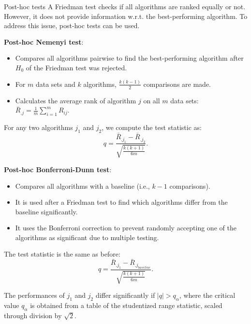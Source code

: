 \begin{vbframe}{Post-hoc tests}
A Friedman test checks if all algorithms are ranked equally or not. However, it does not provide information w.r.t. the best-performing algorithm.
To address this issue, post-hoc tests can be used.

\lz \textbf{Post-hoc Nemenyi test}:
\begin{itemize}
\item Compares all algorithms pairwise to find the best-performing algorithm after $H_0$ of the Friedman test was rejected.
\item For $m$ data sets and $k$ algorithms, $\frac{k(k-1)}{2}$ comparisons are made.
\item Calculates the average rank of algorithm $j$ on all $m$ data sets: $\bar{R}_{.j} =\frac{1}{m} \sum_{i=1}^m R_{ij}.$
\end{itemize}

\lz %
For any two algorithms $j_1$ and $j_2$, we compute the test statistic as:
$$q = \frac{\bar{R}_{.j_1} - \bar{R}_{.j_2}}{\sqrt{\frac{k(k+1)}{6m}}}.$$


\framebreak

\textbf{Post-hoc Bonferroni-Dunn test}:

\begin{itemize}
\item Compares all algorithms with a baseline (i.e., $k-1$ comparisons).
\item It is used after a Friedman test to find which algorithms differ from the baseline significantly.
\item It uses the Bonferroni correction to prevent randomly accepting one of the algorithms as significant due to multiple testing.
\end{itemize}
The test statistic is the same as before:
$$q = \frac{\bar{R}_{.j_1} - \bar{R}_{.j_{baseline}}}{\sqrt{\frac{k(k+1)}{6m}}}.$$

The performances of $j_1$ and $j_2$ differ significantly if $|q| > q_{\alpha}$, where the critical value $q_{\alpha}$ is obtained from a table of the studentized range statistic, scaled through division by $\sqrt{2}$.
\end{vbframe}


